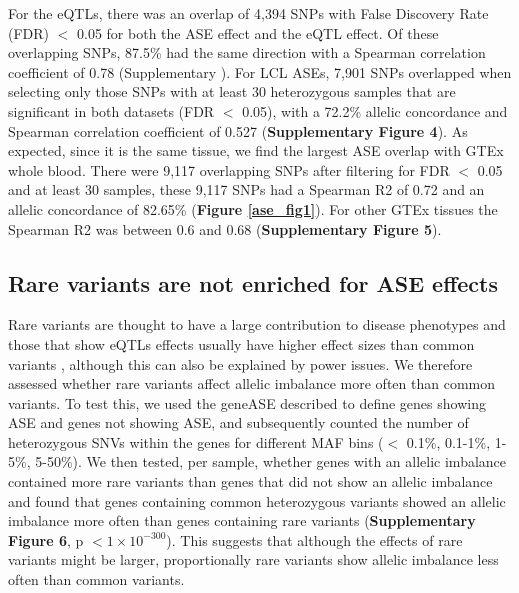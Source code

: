 For the eQTLs, there was an overlap of 4,394 SNPs with False Discovery Rate (FDR) $<$ 0.05 for both the ASE effect and the eQTL effect. Of these overlapping SNPs, 87.5\% had the same direction with a Spearman correlation coefficient of 0.78 (Supplementary ). For LCL ASEs, 7,901 SNPs overlapped when selecting only those SNPs with at least 30 heterozygous samples that are significant in both datasets (FDR $<$ 0.05), with a 72.2\% allelic concordance and Spearman correlation coefficient of 0.527 (\textbf{Supplementary Figure 4}). As expected, since it is the same tissue, we find the largest ASE overlap with GTEx whole blood. There were 9,117 overlapping SNPs after filtering for FDR $<$ 0.05 and at least 30 samples, these 9,117 SNPs had a Spearman R2 of 0.72 and an allelic concordance of 82.65\% (\textbf{Figure \ref{ase_fig1}}). For other GTEx tissues the Spearman R2 was between 0.6 and 0.68 (\textbf{Supplementary Figure 5}).

\subsection{Rare variants are not enriched for ASE effects}
Rare variants are thought to have a large contribution to disease phenotypes and those that show eQTLs effects usually have higher effect sizes than common variants \cite{claringbouldGeneticArchitectureMolecular2017}, although this can also be explained by power issues. We therefore assessed whether rare variants affect allelic imbalance more often than common variants. To test this, we used the geneASE described to define genes showing ASE and genes not showing ASE, and subsequently counted the number of heterozygous SNVs within the genes for different MAF bins ($<$ 0.1\%, 0.1-1\%, 1-5\%, 5-50\%). We then tested, per sample, whether genes with an allelic imbalance contained more rare variants than genes that did not show an allelic imbalance and found that genes containing common heterozygous variants showed an allelic imbalance more often than genes containing rare variants (\textbf{Supplementary Figure 6}, p $< 1 \times 10^{-300}$). This suggests that although the effects of rare variants might be larger, proportionally rare variants show allelic imbalance less often than common variants. 

